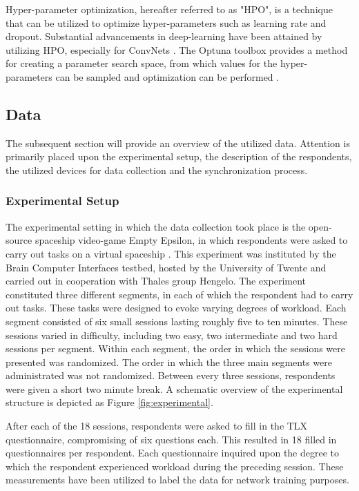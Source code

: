 \documentclass[12pt]{article}
\begin{document}
Hyper-parameter optimization, hereafter referred to as "HPO", is a technique that can be utilized to optimize hyper-parameters such as learning rate and dropout. Substantial advancements in deep-learning have been attained by utilizing HPO, especially for ConvNets \cite{bergstra2012random}. The Optuna toolbox provides a method for creating a parameter search space, from which values for the hyper-parameters can be sampled and optimization can be performed \cite{akiba2019optuna}. 
\bigskip 

\subsection{Data}
The subsequent section will provide an overview of the utilized data. Attention is primarily placed upon the experimental setup, the description of the respondents, the utilized devices for data collection and the synchronization process. 

\subsubsection{Experimental Setup}
The experimental setting in which the data collection took place is the open-source spaceship video-game Empty Epsilon, in which respondents were asked to carry out tasks on a virtual spaceship \cite{daid2016empty}. This experiment was instituted by the Brain Computer Interfaces testbed, hosted by the University of Twente and carried out in cooperation with Thales group Hengelo. The experiment constituted three different segments, in each of which the respondent had to carry out tasks. These tasks were designed to evoke varying degrees of workload. Each segment consisted of six small sessions lasting roughly five to ten minutes. These sessions varied in difficulty, including two easy, two intermediate and two hard sessions per segment. Within each segment, the order in which the sessions were presented was randomized. The order in which the three main segments were administrated was not randomized. Between every three sessions, respondents were given a short two minute break. A schematic overview of the experimental structure is depicted as Figure \ref{fig:experimental}. 

After each of the 18 sessions, respondents were asked to fill in the TLX questionnaire, compromising of six questions each. This resulted in 18 filled in questionnaires per respondent. Each questionnaire inquired upon the degree to which the respondent experienced workload during the preceding session. These measurements have been utilized to label the data for network training purposes. 
\end{document}
